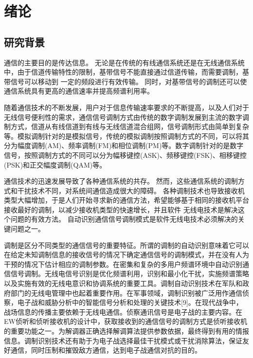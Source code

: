 
\chapter{绪论}
\section{研究背景}
通信的主要目的是传达信息。 无论是在传统的有线通信系统还是在无线通信系统中，由于信道传输特性的限制，基带信号不能直接通过信道传输，而需要调制，基带信号可以移动到 一定的频段进行有效传输。 同时，对基带信号的调制还可以使通信系统具有更高的通信速率并提高频谱利用率。\par

随着通信技术的不断发展，用户对于信息传输速率要求的不断提高，以及人们对于无线信号便利性的需求，通信信号调制方式由传统的数字调制发展到主流的数字调制方式，信道从有线信道到有线与无线信道混合组网，信号调制形式由简单到复杂等。模拟调制针对的是模拟信号，传统的模拟调制按照调制方式的不同，可以将其分为幅度调制(AM)、频率调制(FM)和相位调制(PM)等。数字调制针对的是数字信号，按照调制方式的不同可以分为幅移键控(ASK)、频移键控(FSK)、相移键控(PSK)和正交幅度调制(QAM)等。 \par

通信技术的迅速发展导致了各种通信系统的共存。 然而，这些通信系统的调制方式和干扰技术不同，对系统间通信造成很大的障碍。 各种调制技术也导致接收机类型大幅增加，于是人们开始寻求新的通信方法，希望能够基于相同的接收机平台接收最好的调制，以减少接收机类型的快速增长，并且软件 无线电技术是解决这个问题的有效方法。 自动识别通信信号调制模式是软件无线电技术必须解决的关键问题之一。\par

调制是区分不同类型的通信信号的重要特征。所谓的调制的自动识别意味着它可以在给定未知调制信息的接收信号的情况下确定通信信号的调制模式，并在没有人为干预的情况下估计相应的调制参数。在密集和复杂的多用户频谱环境中自动识别通信信号调制。无线电信号识别是优化频谱利用，识别和最小化干扰，实施频谱策略以及实施有效的无线电意识和协调系统的重要工具。调制自动识别技术在军队和政府部门的无线电管理中也起着重要作用。在军事领域，调制识别被广泛用作通信侦察，电子战和威胁分析中的智能信号分析和处理的关键技术[9]。在现代战争中，战场信息的传播主要依赖于无线电通信。侦察通讯信号是电子战的主要内容。在EW侦听和侦听接收机的设计中，获取接收到的通信信号的调制方式是侦听接收机的重要功能之一。为解调器正确选择解调算法提供参数依据，最终得到有用的情报信息。调制识别技术还有助于为电子战选择最佳干扰模式或干扰消除算法，保证友好通信，同时压制和摧毁敌方通信，达到电子战通信对抗的目的。\par


